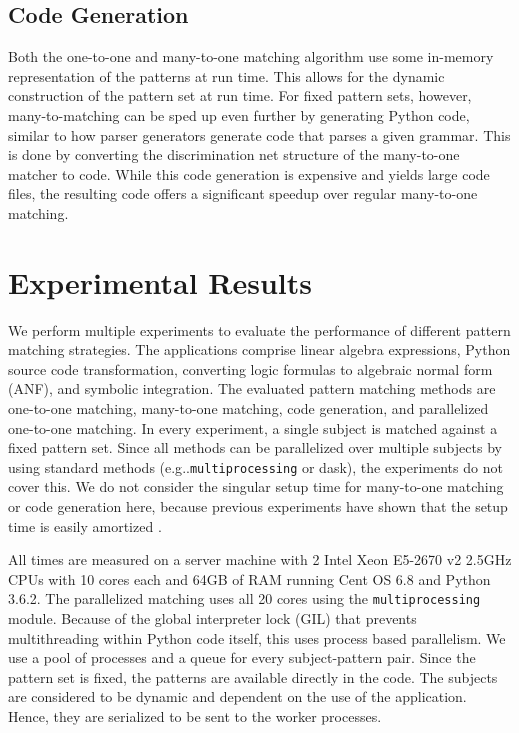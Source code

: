 \documentclass[conference,compsoc]{IEEEtran}
\makeatletter
\DeclareRobustCommand\onedot{\futurelet\@let@token\@onedot}
\def\@onedot{\ifx\@let@token.\else.\null\fi\xspace}
\def\eg{{e.g}\onedot} \def\Eg{{E.g}\onedot}
\makeatother
\begin{document}
\subsection{Code Generation}

Both the one-to-one and many-to-one matching algorithm use some in-memory representation of the patterns at run time.
This allows for the dynamic construction of the pattern set at run time.
For fixed pattern sets, however, many-to-matching can be sped up even further by generating Python code, similar to how parser generators generate code that parses a given grammar.
This is done by converting the discrimination net structure of the many-to-one matcher to code.
While this code generation is expensive and yields large code files,
the resulting code offers a significant speedup over regular many-to-one matching.

\section{Experimental Results}

We perform multiple experiments to evaluate the performance of different pattern matching strategies.
The applications comprise linear algebra expressions, Python source code transformation,
converting logic formulas to algebraic normal form (ANF), and symbolic integration.
The evaluated pattern matching methods are one-to-one matching, many-to-one matching,
code generation, and parallelized one-to-one matching.
In every experiment, a single subject is matched against a fixed pattern set.
Since all methods can be parallelized over multiple subjects by using standard methods
(\eg \texttt{multiprocessing} or dask), the experiments do not cover this.
We do not consider the singular setup time for many-to-one matching or code generation
here, because previous experiments have shown that the setup time is easily amortized \cite{Krebber2017,thesis}.

All times are measured on a server machine with 2 Intel Xeon E5-2670 v2 2.5GHz CPUs with 10 cores each and 64GB of RAM running Cent OS 6.8 and Python 3.6.2.
The parallelized matching uses all 20 cores using the \texttt{multiprocessing} module.
Because of the global interpreter lock (GIL) that prevents multithreading within Python code itself, this uses process based parallelism.
We use a pool of processes and a queue for every subject-pattern pair.
Since the pattern set is fixed, the patterns are available directly in the code.
The subjects are considered to be dynamic and dependent on the use of the application. Hence, they are serialized to be sent to the worker processes.
\end{document}
